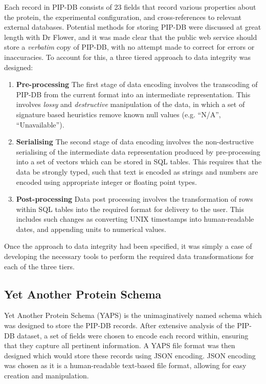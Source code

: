 Each record in PIP-DB consists of 23 fields that record various
properties about the protein, the experimental configuration, and
cross-references to relevant external databases. Potential methods for
storing PIP-DB were discussed at great length with Dr Flower, and it
was made clear that the public web service should store a
\textit{verbatim} copy of PIP-DB, with no attempt made to correct for
errors or inaccuracies. To account for this, a three tiered approach
to data integrity was designed:

\begin{enumerate}
\item \textbf{Pre-processing} The first stage of data encoding
  involves the transcoding of PIP-DB from the current format into an
  intermediate representation. This involves \textit{lossy} and
  \textit{destructive} manipulation of the data, in which a set of
  signature based heuristics remove known null values (e.g. ``N/A'',
  ``Unavailable'').
\item \textbf{Serialising} The second stage of data encoding involves
  the non-destructive serialising of the intermediate data
  representation produced by pre-processing into a set of vectors
  which can be stored in SQL tables. This requires that the data be
  strongly typed, such that text is encoded as strings and numbers are
  encoded using appropriate integer or floating point types.
\item \textbf{Post-processing} Data post processing involves the
  transformation of rows within SQL tables into the required format
  for delivery to the user. This includes such changes as converting
  UNIX timestamps into human-readable dates, and appending units to
  numerical values.
\end{enumerate}

Once the approach to data integrity had been specified, it was simply
a case of developing the necessary tools to perform the required data
transformations for each of the three tiers.

\subsection{Yet Another Protein Schema}\label{subsec:yaps}

Yet Another Protein Schema (YAPS) is the unimaginatively named schema
which was designed to store the PIP-DB records. After extensive
analysis of the PIP-DB dataset, a set of fields were chosen to encode
each record within, ensuring that they capture all pertinent
information. A YAPS file format was then designed which would store
these records using JSON encoding. JSON encoding was chosen as it is a
human-readable text-based file format, allowing for easy creation and
manipulation.

